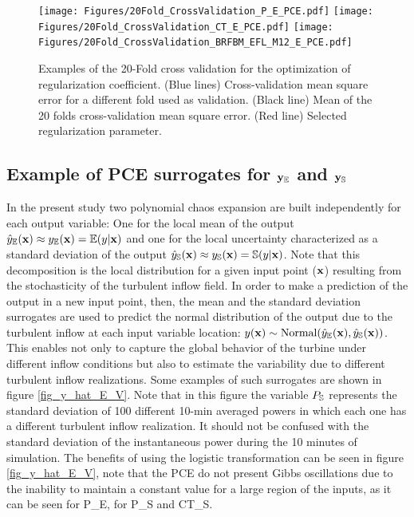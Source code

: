 \documentclass[preprint,12pt]{elsarticle}
\begin{document}
\begin{figure}[h!]
\begin{centering}
\texttt{[image: Figures/20Fold\_CrossValidation\_P\_E\_PCE.pdf]} \texttt{[image: Figures/20Fold\_CrossValidation\_CT\_E\_PCE.pdf]} \texttt{[image: Figures/20Fold\_CrossValidation\_BRFBM\_EFL\_M12\_E\_PCE.pdf]}
\caption{Examples of the 20-Fold cross validation for the optimization of regularization coefficient. (Blue lines) Cross-validation mean square error for a different fold used as validation. (Black line) Mean of the 20 folds cross-validation mean square error. (Red line) Selected regularization parameter.}
\label{fig_20fold}
\end{centering}
\end{figure}


\subsection{Example of PCE surrogates for $\mathbf{y}_{\mathbb{E}}$ and $\mathbf{y}_{\mathbb{S}}$}

In the present study two polynomial chaos expansion are built independently for each output variable: One for the local mean of the output $\hat{y}_{\mathbb{E}}(\mathbf{x})\approx y_{\mathbb{E}}(\mathbf{x})=\mathbb{E}(y|\mathbf{x})$ and one for the local uncertainty characterized as a standard deviation of the output $\hat{y}_{\mathbb{S}}(\mathbf{x}) \approx y_{\mathbb{S}}(\mathbf{x})=\mathbb{S}(y|\mathbf{x})$. Note that this decomposition is the local distribution for a given input point ($\mathbf{x}$) resulting from the stochasticity of the turbulent inflow field. In order to make a prediction of the output in a new input point, then, the mean and the standard deviation surrogates are used to predict the normal distribution of the output due to the turbulent inflow at each input variable location: $y(\mathbf{x}) \sim \text{Normal} (\hat{y}_{\mathbb{E}}(\mathbf{x}),\hat{y}_{\mathbb{S}}(\mathbf{x}))$. This enables not only to capture the global behavior of the turbine under different inflow conditions but also to estimate the variability due to different turbulent inflow realizations. Some examples of such surrogates are shown in figure \ref{fig_y_hat_E_V}. Note that in this figure the variable $P_{\mathbb{S}}$ represents the standard deviation of 100 different 10-min averaged powers in which each one has a different turbulent inflow realization. It should not be confused with the standard deviation of the instantaneous power during the 10 minutes of simulation. The benefits of using the logistic transformation can be seen in figure \ref{fig_y_hat_E_V}, note that the PCE do not present Gibbs oscillations due to the inability to maintain a constant value for a large region of the inputs, as it can be seen for P\_E, for P\_S and CT\_S.
\end{document}
